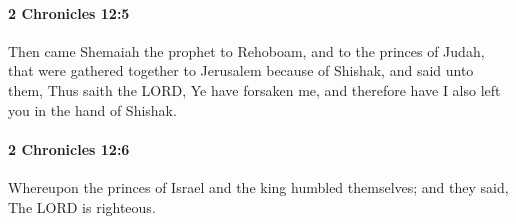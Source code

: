		\paragraph{2 Chronicles 12:5} %
			\label{2CHRONICLES-12-5}

			Then came Shemaiah the prophet to Rehoboam, and to the princes of Judah, that were gathered together to Jerusalem because of Shishak, and said unto them, Thus saith the LORD, Ye have forsaken me, and therefore have I also left you in the hand of Shishak.


		\paragraph{2 Chronicles 12:6} %
			\label{2CHRONICLES-12-6}

			Whereupon the princes of Israel and the king humbled themselves; and they said, The LORD is righteous.

